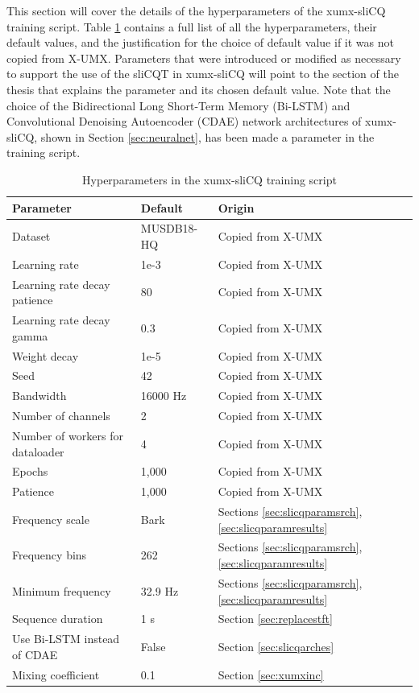 \documentclass[report.tex]{subfiles}
\begin{document}
This section will cover the details of the hyperparameters of the xumx-sliCQ training script. Table \ref{table:xumxslicqparams} contains a full list of all the hyperparameters, their default values, and the justification for the choice of default value if it was not copied from X-UMX. Parameters that were introduced or modified as necessary to support the use of the sliCQT in xumx-sliCQ will point to the section of the thesis that explains the parameter and its chosen default value. Note that the choice of the Bidirectional Long Short-Term Memory (Bi-LSTM) and Convolutional Denoising Autoencoder (CDAE) network architectures of xumx-sliCQ, shown in Section \ref{sec:neuralnet}, has been made a parameter in the training script.

\begin{table}[ht]
	\centering
	\caption{Hyperparameters in the xumx-sliCQ training script}
	\label{table:xumxslicqparams}
	\begin{tabular}{ |l|l|l| }
	 \hline
		Parameter & Default & Origin \\
	 \hline
	 \hline
		Dataset & MUSDB18-HQ & Copied from X-UMX \\
	 \hline
		Learning rate & 1e-3 & Copied from X-UMX \\
	 \hline
		Learning rate decay patience & 80 & Copied from X-UMX \\
	 \hline
		Learning rate decay gamma & 0.3 & Copied from X-UMX \\
	 \hline
		Weight decay & 1e-5 & Copied from X-UMX \\
	 \hline
	 	Seed & 42 & Copied from X-UMX \\
	 \hline
	 	Bandwidth & 16000 Hz & Copied from X-UMX \\
	 \hline
	 	Number of channels & 2 & Copied from X-UMX \\
	 \hline
	 	Number of workers for dataloader & 4 & Copied from X-UMX \\
	 \hline
		Epochs & 1,000 & Copied from X-UMX \\
	 \hline
		Patience & 1,000 & Copied from X-UMX \\
	 \hline
		Frequency scale & Bark & Sections \ref{sec:slicqparamsrch}, \ref{sec:slicqparamresults} \\
	 \hline
		Frequency bins & 262 & Sections \ref{sec:slicqparamsrch}, \ref{sec:slicqparamresults} \\
	 \hline
	 	Minimum frequency & 32.9 Hz & Sections \ref{sec:slicqparamsrch}, \ref{sec:slicqparamresults} \\
	 \hline
		Sequence duration & 1 s & Section \ref{sec:replacestft} \\
	 \hline
		Use Bi-LSTM instead of CDAE & False & Section \ref{sec:slicqarches}  \\
	 \hline
		Mixing coefficient & 0.1 & Section \ref{sec:xumxinc} \\
	 \hline
\end{tabular}
\end{table}
\end{document}
